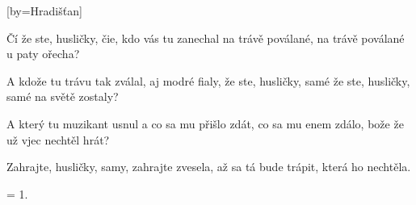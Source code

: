 [by={Hradišťan}]

\beginverse{}
\lrep{} Čí že ste, husličky, čie, kdo vás tu zanechal \rrep{}
na trávě poválané, na trávě poválané u paty ořecha?
\endverse{}

\beginverse*{}
  
\lrep{} A kdože tu trávu tak zválal, aj modré fialy, \rrep{}
že ste, husličky, samé že ste, husličky, samé na světě zostaly?
\endverse{}

\beginverse*{}
  
\endverse{}

\beginverse{}
\lrep{} A který tu muzikant usnul a co sa mu přišlo zdát, \rrep{}
\lrep{} co sa mu enem zdálo, bože \rrep{} že už vjec nechtěl hrát?
\endverse{}

\beginverse{}
\lrep{} Zahrajte, husličky, samy, zahrajte zvesela, \rrep{}
\lrep{} až sa tá bude trápit, \rrep{} která ho nechtěla.
\endverse{}

\beginverse{}
= 1.
\endverse{}

\beginverse*{}
     
\endverse{}

\endsong{}
